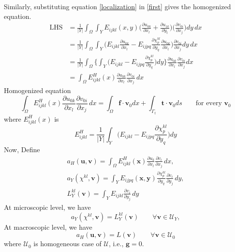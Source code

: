 \documentclass[10pt]{article}
\begin{document}
Similarly, substituting equation \eqref{localization} in \eqref{first} gives the homogenized equation.
\begin{align*}
\text{LHS}&=\frac{1}{|Y|}\int_\Omega\int_Y E_{ijkl}(x,y)\bigg (\frac{\partial u_{0k}}{\partial x_l}+\frac{\partial u_{1k}}{\partial y_l}\bigg )\bigg (\frac{\partial v_{0i}}{\partial x_j}\bigg ) dy\,dx\\
&=\frac{1}{|Y|}\int_\Omega\int_Y \bigg (E_{ijkl}\frac{\partial u_{0k}}{\partial x_l}-E_{ijpq}\frac{\partial \chi^{kl}_p}{\partial y_q}\frac{\partial u_{0k}}{\partial x_l}\bigg )\frac{\partial v_{0i}}{\partial x_j} dy\,dx\\
&=\frac{1}{|Y|}\int_\Omega\Bigg \{\int_Y \bigg (E_{ijkl}-E_{ijpq}\frac{\partial \chi^{kl}_p}{\partial y_q}\bigg )dy\Bigg \}\frac{\partial u_{0k}}{\partial x_l}\frac{\partial v_{0i}}{\partial x_j}dx\\
&=\int_\Omega E^H_{ijkl}(x)\frac{\partial u_{0k}}{\partial x_l}\frac{\partial v_{0i}}{\partial x_j}\,dx
\end{align*}
Homogenized equation
\begin{equation}
\int_\Omega E^H_{ijkl}(x)\frac{\partial u_{0k}}{\partial x_l}\frac{\partial v_{0i}}{\partial x_j}\,dx = \int_\Omega\textbf{f}\cdot\textbf{v}_0 dx + \int_{\Gamma_t}\textbf{t}\cdot\textbf{v}_0 ds \qquad \text{for every } \textbf{v}_0
\end{equation}
where $E^H_{ijkl}(x)$ is
\begin{equation}
\boxed{E^H_{ijkl} = \frac{1}{|Y|}\int_Y \bigg (E_{ijkl}-E_{ijpq}\frac{\partial \chi^{kl}_p}{\partial y_q}\bigg ) dy}
\end{equation}
Now, Define
\begin{eqnarray}
a_H(\textbf{u},\textbf{v}) = \int_\Omega E^H_{ijkl}(\textbf{x})\frac{\partial u_k}{\partial x_l}\frac{\partial v_i}{\partial	x_j}\, dx,\\
a_Y(\chi^{kl}, \textbf{v})=\int_Y E_{ijpq}(\textbf{x},\textbf{y})\frac{\partial \chi^{kl}_p}{\partial y_q}\frac{\partial v_i}{\partial y_j}\,dy,\\
L^{kl}_Y(\textbf{v})=\int_Y E_{ijkl} \frac{\partial v_i}{\partial y_j}\, dy
\end{eqnarray}
At microscopic level, we have
\begin{equation}\label{microscopic}
a_Y(\chi^{kl}, \textbf{v}) = L_Y^{kl}(\textbf{v})\qquad \forall \textbf{v}\in \mathcal{U}_Y,
\end{equation}
At macroscopic level, we have
\begin{equation}
a_H(\textbf{u},\textbf{v}) = L(\textbf{v})\qquad \forall \textbf{v}\in \mathcal{U}_0
\end{equation}
where $\mathcal{U}_0$ is homogeneous case of $\mathcal{U}$, i.e., $\textbf{g}=0$.
\end{document}
